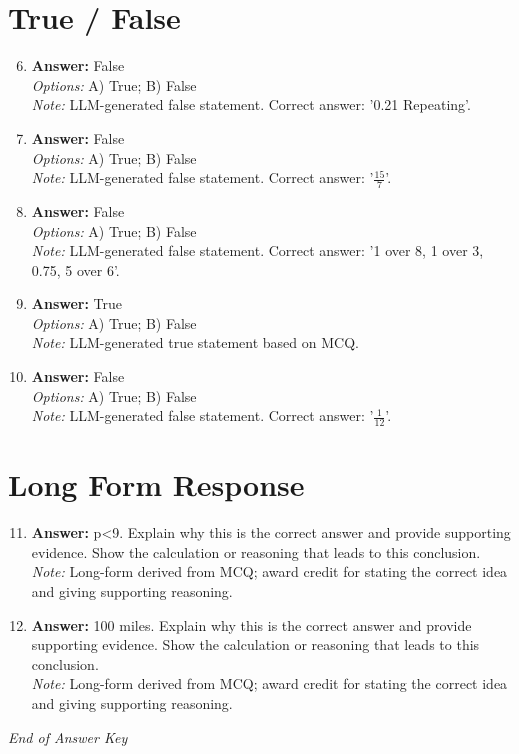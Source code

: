 \documentclass[12pt]{article}
\begin{document}
\section*{True / False}
\begin{enumerate}[label=\arabic*.]
\setcounter{enumi}{5}
\item \textbf{Answer:} False
\\ \textit{Options:} A) True; B) False
\\ \textit{Note:} LLM-generated false statement. Correct answer: '0.21 Repeating'.
\item \textbf{Answer:} False
\\ \textit{Options:} A) True; B) False
\\ \textit{Note:} LLM-generated false statement. Correct answer: '\ensuremath{\frac{15}{7}}'.
\item \textbf{Answer:} False
\\ \textit{Options:} A) True; B) False
\\ \textit{Note:} LLM-generated false statement. Correct answer: '1 over 8, 1 over 3, 0.75, 5 over 6'.
\item \textbf{Answer:} True
\\ \textit{Options:} A) True; B) False
\\ \textit{Note:} LLM-generated true statement based on MCQ.
\item \textbf{Answer:} False
\\ \textit{Options:} A) True; B) False
\\ \textit{Note:} LLM-generated false statement. Correct answer: '\ensuremath{\frac{1}{12}}'.
\end{enumerate}

\section*{Long Form Response}
\begin{enumerate}[label=\arabic*.]
\setcounter{enumi}{10}
\item \textbf{Answer:} p\textless{}9. Explain why this is the correct answer and provide supporting evidence. Show the calculation or reasoning that leads to this conclusion.
\\ \textit{Note:} Long-form derived from MCQ; award credit for stating the correct idea and giving supporting reasoning.
\item \textbf{Answer:} 100 miles. Explain why this is the correct answer and provide supporting evidence. Show the calculation or reasoning that leads to this conclusion.
\\ \textit{Note:} Long-form derived from MCQ; award credit for stating the correct idea and giving supporting reasoning.
\end{enumerate}

\vfill
\noindent\textit{End of Answer Key}
\end{document}
